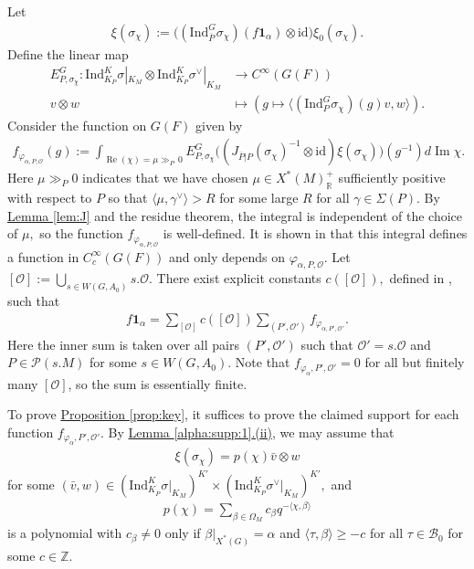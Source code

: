 \documentclass[10pt]{amsart}
\theoremstyle{definition}
\numberwithin{equation}{section}
\numberwithin{equation}{subsection}
\newcommand{\ZZ}{\mathbb{Z}}
\newcommand{\RR}{\mathbb{R}}
\newcommand{\calO}{\mathcal{O}}
\newcommand{\calB}{\mathcal{B}}
\renewcommand{\Im}{\mathop{\mathrm{Im}}}
\renewcommand{\Re}{\mathop{\mathrm{Re}}}
\begin{document}
Let 
\begin{align*}
\xi(\sigma_\chi):=\bigg((\mathrm{Ind}_{\overline{P}}^G \sigma_\chi)(f\mathbf{1}_\alpha)\otimes \mathrm{id}\bigg)\xi_0(\sigma_\chi).
\end{align*}
Define the linear map
\begin{align*}
E   ^{G}_{P,\sigma_\chi}:\mathrm{Ind}_{K_P}^K \sigma|_{K_M}\otimes \mathrm{Ind}_{K_{P}}^K \sigma^\lor |_{K_M}&\longrightarrow C^\infty(G(F))\\
    v\otimes w&\longmapsto \left(g\mapsto \langle (\mathrm{Ind}_P^G\sigma_\chi)(g)v,w\rangle\right).
\end{align*}
Consider the function on $G(F)$ given by
\begin{align}\label{eq:falphaPO}
    f_{\varphi_{\alpha,P,\calO}}(g):=\int_{\Re(\chi)=\mu\gg_P \,0} E^{G}_{P,\sigma_\chi}\big((J_{\overline{P}|P}(\sigma_\chi)^{-1}\otimes \mathrm{id})\xi(\sigma_\chi)\big)(g^{-1}) d\Im\chi.
\end{align}
Here $\mu\gg_P 0$ indicates that we have chosen $\mu\in X^\ast(M)_\RR^+$ sufficiently positive with respect to $P$ so that $\langle \mu, \gamma^\lor\rangle>R$ for some large $R$ for all $\gamma\in \Sigma(P).$ By \hyperref[lem:J]{Lemma \ref{lem:J}} and the residue theorem, the integral is independent of the choice of $\mu,$ so the function $f_{\varphi_{\alpha,P,\calO}}$ is well-defined. It is shown in \cite{Heiermann:HeckePlan} that this integral defines a function in $C^\infty_c(G(F))$ and only depends on $\varphi_{\alpha,P,\mathcal{O}}$. Let $[\mathcal{O}]:=\bigcup_{s\in W(G,A_0)}s.\mathcal{O}.$ There exist explicit constants $c([\mathcal{O}]),$ defined in \cite[\S 3.2]{Heiermann:HeckePlan}, such that
\begin{align*}
    f\mathbf{1}_\alpha=\sum_{[\mathcal{O}]}c([\mathcal{O}])\sum_{(P',\mathcal{O'})}f_{\varphi_{\alpha,P',\calO'}}.
\end{align*}
Here the inner sum is taken over all pairs $(P',\calO')$ such that $ \mathcal{O'}=s.\mathcal{O}$ and $P\in \mathcal{P}(s.M)$ for some $s\in W(G,A_0).$ Note that $f_{\varphi_\alpha,P',\mathcal{O'}} = 0$ for all but finitely many $[\mathcal{O}]$, so the sum is essentially finite. 

To prove \hyperref[prop:key]{Proposition \ref{prop:key}}, it suffices to prove the claimed support for each function $f_{\varphi_\alpha,P',\mathcal{O}'}$. By \hyperref[alpha:supp:1]{Lemma \ref{alpha:supp:1}.(ii)}, we may assume that
\begin{align*}
    \xi(\sigma_\chi)=p(\chi)\bar{v}\otimes w
\end{align*}
for some $(\bar{v},w)\in (\mathrm{Ind}_{K_{\overline{P}}}^K\sigma|_{K_M})^{K'}\times (\mathrm{Ind}_{K_P}^K\sigma^\lor |_{K_M})^{K'},$ and
\begin{align}\label{eq:p:expansion}
    p(\chi)=\sum_{\beta\in \Omega_M} c_\beta q^{-\langle \chi,\beta\rangle}
\end{align}
is a polynomial with $c_\beta\neq 0$ only if $\beta\vert_{X^*(G)} = \alpha$ and $  \langle \tau,\beta\rangle\geq -c$ for all $\tau\in \calB_0$ for some $c\in \ZZ$. 
\end{document}
